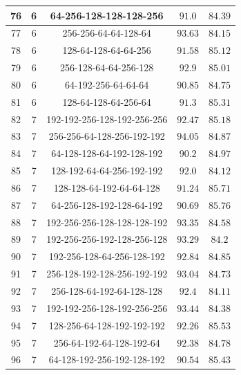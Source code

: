 \documentclass{article}
\begin{document}
\begin{longtable}{|c|c|c|c|c|}
        76 & 6 &  64-256-128-128-128-256 & $91.0$ & $84.39$ \\ \hline
        77 & 6 &  256-256-64-64-128-64 & $93.63$ & $84.15$ \\ \hline
        78 & 6 &  128-64-128-64-64-256 & $91.58$ & $85.12$ \\ \hline
        79 & 6 &  256-128-64-64-256-128 & $92.9$ & $85.01$ \\ \hline
        80 & 6 &  64-192-256-64-64-64 & $90.85$ & $84.75$ \\ \hline
        81 & 6 &  128-64-128-64-256-64 & $91.3$ & $85.31$ \\ \hline
        82 & 7 &  192-192-256-128-192-256-256 & $92.47$ & $85.18$ \\ \hline
        83 & 7 &  256-256-64-128-256-192-192 & $94.05$ & $84.87$ \\ \hline
        84 & 7 &  64-128-128-64-192-128-192 & $90.2$ & $84.97$ \\ \hline
        85 & 7 &  128-192-64-64-256-192-192 & $92.0$ & $84.12$ \\ \hline
        86 & 7 &  128-128-64-192-64-64-128 & $91.24$ & $85.71$ \\ \hline
        87 & 7 &  64-256-128-192-128-64-192 & $90.69$ & $85.76$ \\ \hline
        88 & 7 &  192-256-256-128-128-128-192 & $93.35$ & $84.58$ \\ \hline
        89 & 7 &  192-256-256-192-128-256-128 & $93.29$ & $84.2$ \\ \hline
        90 & 7 &  192-256-128-64-256-128-192 & $92.84$ & $84.85$ \\ \hline
        91 & 7 &  256-128-192-128-256-192-192 & $93.04$ & $84.73$ \\ \hline
        92 & 7 &  256-128-64-192-64-128-128 & $92.4$ & $84.11$ \\ \hline
        93 & 7 &  192-192-256-128-192-256-256 & $93.44$ & $84.38$ \\ \hline
        94 & 7 &  128-256-64-128-192-192-192 & $92.26$ & $85.53$ \\ \hline
        95 & 7 &  256-64-192-64-128-192-64 & $92.38$ & $84.78$ \\ \hline
        96 & 7 &  64-128-192-256-192-128-192 & $90.54$ & $85.43$ \\ \hline
    \end{longtable}
\end{document}
